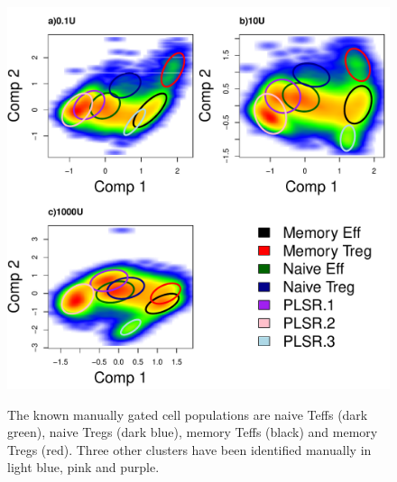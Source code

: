 \begin{figure}
  \centering
\begin{minipage}{.6\textwidth}
  \includegraphics[width=\linewidth]{figures/plsr-lymphocytes.pdf}
\end{minipage}
\begin{minipage}{.3\textwidth}
{
The known manually gated cell populations are naive Teffs (dark green), naive Tregs (dark blue), memory Teffs (black) and memory Tregs (red).
Three other clusters have been identified manually in light blue, pink and purple.
} 
\end{minipage}
%
\begin{minipage}{.6\textwidth}

\end{minipage}
\end{figure}
